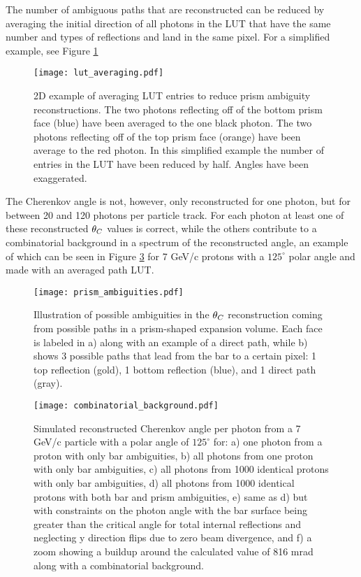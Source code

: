 The number of ambiguous paths that are reconstructed can be reduced by averaging the initial direction of all photons in the LUT that have the same number and types of reflections and land in the same pixel. For a simplified example, see Figure \ref{fig:lut_averaging}

\begin{figure}[!htb]
	\centering
	\texttt{[image: lut\_averaging.pdf]}
	\caption{2D example of averaging LUT entries to reduce prism ambiguity reconstructions. The two photons reflecting off of the bottom prism face (blue) have been averaged to the one black photon. The two photons reflecting off of the top prism face (orange) have been average to the red photon. In this simplified example the number of entries in the LUT have been reduced by half. Angles have been exaggerated.}
	\label{fig:lut_averaging}
\end{figure}

The Cherenkov angle is not, however, only reconstructed for one photon, but for between 20 and 120 photons per particle track. For each photon at least one of these reconstructed $\theta_{C}$ values is correct, while the others contribute to a combinatorial background in a spectrum of the reconstructed angle, an example of which can be seen in Figure \ref{fig:combinatorial_background} for 7 GeV/c protons with a $125^{\circ}$ polar angle and made with an averaged path LUT.

\begin{figure}[!htb]
	\centering
	\texttt{[image: prism\_ambiguities.pdf]}
	\caption{Illustration of possible ambiguities in the $\theta_{C}$ reconstruction coming from possible paths in a prism-shaped expansion volume. Each face is labeled in a) along with an example of a direct path, while b) shows 3 possible paths that lead from the bar to a certain pixel: 1 top reflection (gold), 1 bottom reflection (blue), and 1 direct path (gray).}
	\label{fig:prism_ambiguities}
\end{figure}

\begin{figure}[!htb]
	\centering
	\texttt{[image: combinatorial\_background.pdf]}
	\caption{Simulated reconstructed Cherenkov angle per photon from a 7 GeV/c particle with a polar angle of $125^{\circ}$ for: a) one photon from a proton with only bar ambiguities, b) all photons from one proton with only bar ambiguities, c) all photons from 1000 identical protons with only bar ambiguities, d) all photons from 1000 identical protons with both bar and prism ambiguities, e) same as d) but with constraints on the photon angle with the bar surface being greater than the critical angle for total internal reflections and neglecting y direction flips due to zero beam divergence, and f) a zoom showing a buildup around the calculated value of 816 mrad along with a combinatorial background.}
	\label{fig:combinatorial_background}
\end{figure}

